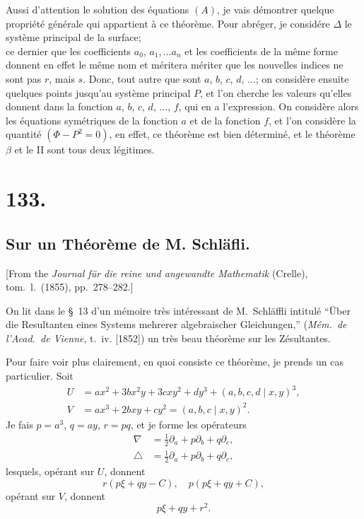 \documentclass[11pt,a4paper]{article}
\begin{document}
Aussi d'attention le solution des \'equations $(A)$, je vais d\'emontrer quelque propri\'et\'e g\'en\'erale qui appartient \`a ce th\'eor\`eme. Pour abr\'eger, je consid\'ere $\Delta$ le syst\`eme principal de la surface; \\
ce dernier que les coefficients $a_0$, $a_1, \ldots a_n$ et les coefficients de la m\^eme forme donnent en effet le m\^eme nom et m\'eritera m\'eriter que les nouvelles indices ne sont pas $r$, mais $s$. Donc, tout autre que sont $a$, $b$, $c$, $d$, $\ldots$; on consid\`ere ensuite quelques points jusqu'au syst\`eme principal $P$, et l'on cherche les valeurs qu'elles donnent dans la fonction $a$, $b$, $c$, $d$, $\ldots$, $f$, qui en a l'expression. On consid\`ere alors les \'equations sym\'etriques de la fonction $a$ et de la fonction $f$, et l'on consid\`ere la quantit\'e $(\Phi - P^2 = 0)$, en effet, ce th\'eor\`eme est bien d\'etermin\'e, et le th\'eor\`eme $\beta$ et le II sont tous deux l\'egitimes.


\section*{133.}
\subsection*{Sur un Th\'eor\`eme de M. Schl\"afli.}


[From the \textit{Journal f\"ur die reine und angewandte Mathematik} (Crelle), tom.\ l.\ (1855), pp.\ 278--282.]

\medskip

On lit dans le \S\ 13 d'un m\'emoire tr\`es int\'eressant de M.\ Schl\"affli intitul\'e ``\"Uber die Resultanten eines Systems mehrerer algebraischer Gleichungen,'' (\textit{M\'em.\ de l'Acad.\ de Vienne}, t.\ iv. [1852]) un tr\`es beau th\'eor\`eme sur les Z\'esultantes.

\medskip

Pour faire voir plus clairement, en quoi consiste ce th\'eor\`eme, je prends un cas particulier. Soit
\begin{align*}
U &= a x^2 + 3 b x^2 y + 3 c x y^2 + d y^3 + (a, b, c, d \mid x, y)^3,\\
V &= a x^3 + 2 b x y + c y^2 = (a, b, c \mid x, y)^2.
\end{align*}
Je fais $p = a^3$, $q = ay$, $r = pq$, et je forme les op\'erateurs
\begin{align*}
\nabla &= \tfrac{1}{2}\partial_a + p\partial_b + q\partial_c,\\
\bigtriangleup &= \tfrac{1}{2}\partial_a + p\partial_b + q\partial_c,
\end{align*}
lesquels, op\'erant sur $U$, donnent
\[
r (p\xi + qy - C),\quad p(p\xi + qy + C),
\]
op\'erant sur $V$, donnent
\[
p\xi + qy + r^2.
\]
\end{document}
